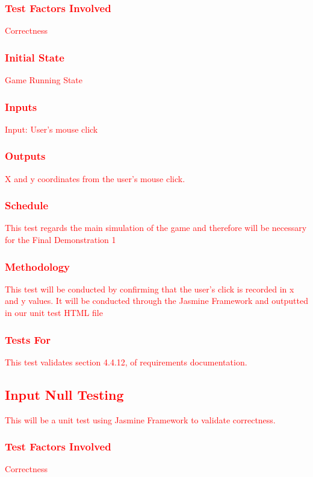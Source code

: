\documentclass[11pt, oneside]{article}   	%
\begin{document}
\subsubsection{\textcolor{red}{Test Factors Involved}}
\textcolor{red}{Correctness}
\subsubsection{\textcolor{red}{Initial State}}
\textcolor{red}{Game Running State}
\subsubsection{\textcolor{red}{Inputs}}
\textcolor{red}{Input: User's mouse click}
\subsubsection{\textcolor{red}{Outputs}}
\textcolor{red}{X and y coordinates from the user's mouse click.}
\subsubsection{\textcolor{red}{Schedule}}
\textcolor{red}{This test regards the main simulation of the game and therefore will be necessary for the Final Demonstration 1}
\subsubsection{\textcolor{red}{Methodology}}
\textcolor{red}{This test will be conducted by confirming that the user's click is recorded in x and y values. It will be conducted through the Jasmine Framework and outputted in our unit test HTML file}
\subsubsection{\textcolor{red}{Tests For}}
\textcolor{red}{This test validates section 4.4.12, of requirements documentation.}



\subsection{\textcolor{red}{Input Null Testing}}
\textcolor{red}{This will be a unit test using Jasmine Framework to validate correctness.}
\subsubsection{\textcolor{red}{Test Factors Involved}}
\textcolor{red}{Correctness}
\end{document}
